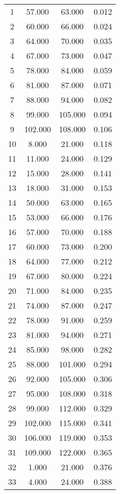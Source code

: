% 
\begin{tabular}{cccc}
  \hline
  \hline
1 & 57.000 & 63.000 & 0.012 \\ 
  2 & 60.000 & 66.000 & 0.024 \\ 
  3 & 64.000 & 70.000 & 0.035 \\ 
  4 & 67.000 & 73.000 & 0.047 \\ 
  5 & 78.000 & 84.000 & 0.059 \\ 
  6 & 81.000 & 87.000 & 0.071 \\ 
  7 & 88.000 & 94.000 & 0.082 \\ 
  8 & 99.000 & 105.000 & 0.094 \\ 
  9 & 102.000 & 108.000 & 0.106 \\ 
  10 & 8.000 & 21.000 & 0.118 \\ 
  11 & 11.000 & 24.000 & 0.129 \\ 
  12 & 15.000 & 28.000 & 0.141 \\ 
  13 & 18.000 & 31.000 & 0.153 \\ 
  14 & 50.000 & 63.000 & 0.165 \\ 
  15 & 53.000 & 66.000 & 0.176 \\ 
  16 & 57.000 & 70.000 & 0.188 \\ 
  17 & 60.000 & 73.000 & 0.200 \\ 
  18 & 64.000 & 77.000 & 0.212 \\ 
  19 & 67.000 & 80.000 & 0.224 \\ 
  20 & 71.000 & 84.000 & 0.235 \\ 
  21 & 74.000 & 87.000 & 0.247 \\ 
  22 & 78.000 & 91.000 & 0.259 \\ 
  23 & 81.000 & 94.000 & 0.271 \\ 
  24 & 85.000 & 98.000 & 0.282 \\ 
  25 & 88.000 & 101.000 & 0.294 \\ 
  26 & 92.000 & 105.000 & 0.306 \\ 
  27 & 95.000 & 108.000 & 0.318 \\ 
  28 & 99.000 & 112.000 & 0.329 \\ 
  29 & 102.000 & 115.000 & 0.341 \\ 
  30 & 106.000 & 119.000 & 0.353 \\ 
  31 & 109.000 & 122.000 & 0.365 \\ 
  32 & 1.000 & 21.000 & 0.376 \\ 
  33 & 4.000 & 24.000 & 0.388 \\ 

\end{tabular}

